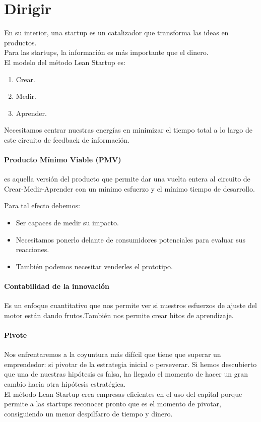 \documentclass[10pt]{article}
\begin{document}
\part*{\center Dirigir}
\begin{multicols}{2}
{\color{blue}En su interior, una startup es un catalizador que
transforma las ideas en productos.}\\
Para las startups, la información es más importante que el dinero.\\
El modelo del método Lean Startup es:
\begin{enumerate}
\item Crear.
\item Medir.
\item Aprender.
\end{enumerate}
{\color{blue}Necesitamos centrar nuestras energías en minimizar el tiempo total a lo largo de este circuito de feedback de información.}
{\color{blue} \subsection*{Producto Mínimo Viable (PMV)} es aquella versión del producto que permite dar una vuelta entera al circuito de Crear-Medir-Aprender con un mínimo esfuerzo y el mínimo tiempo de desarrollo.} Para tal efecto debemos:
\begin{itemize}
\item Ser capaces de medir su impacto.
\item Necesitamos ponerlo delante de consumidores potenciales para evaluar sus reacciones.
\item También podemos necesitar venderles el prototipo.
\end{itemize}

\subsection*{Contabilidad de la innovación}
Es un enfoque cuantitativo que nos permite ver si nuestros esfuerzos de ajuste del motor están dando frutos.También nos permite crear hitos de aprendizaje.
\subsection*{Pivote}
Nos enfrentaremos a la coyuntura más difícil que tiene que superar un emprendedor: si pivotar de la estrategia inicial o perseverar. Si hemos descubierto que una de nuestras hipótesis es falsa, ha llegado el momento de hacer un gran cambio hacia otra hipótesis estratégica.\\El método Lean Startup crea empresas eficientes en el uso del capital porque permite a las startups reconocer pronto que es el momento de pivotar, consiguiendo un menor despilfarro de tiempo y dinero.

\end{multicols}
\end{document}
